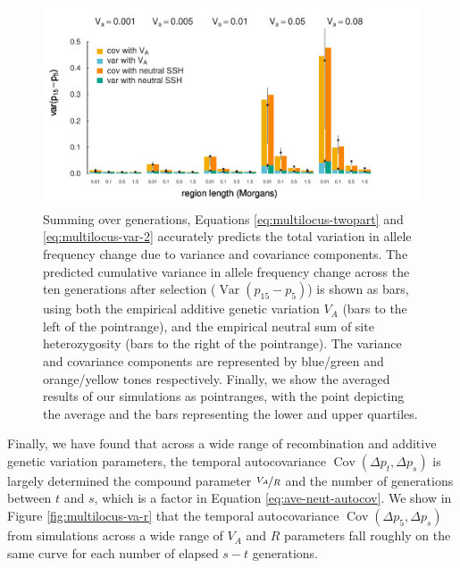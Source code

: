 \documentclass[11pt]{article}
\DeclareMathOperator{\var}{Var}
\DeclareMathOperator{\cov}{Cov}
\begin{document}
\begin{figure}[!ht]
  \centering
  \includegraphics{./images/cummulative-cov-var-all.pdf}

  \caption{Summing over generations, Equations \eqref{eq:multilocus-twopart}
    and \eqref{eq:multilocus-var-2} accurately predicts the total variation in
    allele frequency change due to variance and covariance components. The
    predicted cumulative variance in allele frequency change across the ten
    generations after selection ($\var(p_{15} - p_5)$) is shown as bars, using
    both the empirical additive genetic variation $V_A$ (bars to the left of
    the pointrange), and the empirical neutral sum of site heterozygosity (bars
    to the right of the pointrange). The variance and covariance components are
    represented by blue/green and orange/yellow tones respectively. Finally, we
    show the averaged results of our simulations as pointranges, with the point
  depicting the average and the bars representing the lower and upper
quartiles.} \label{fig:multilocus-expfit-cumcov}

\end{figure}

Finally, we have found that across a wide range of recombination and additive
genetic variation parameters, the temporal autocovariance $\cov(\Delta p_t,
\Delta p_s)$ is largely determined the compound parameter $\nicefrac{V_A}{R}$
and the number of generations between $t$ and $s$, which is a factor in
Equation \eqref{eq:ave-neut-autocov}. We show in Figure
\ref{fig:multilocus-va-r} that the temporal autocovariance $\cov(\Delta p_5,
\Delta p_s)$ from simulations across a wide range of $V_A$ and $R$ parameters
fall roughly on the same curve for each number of elapsed $s-t$ generations.
\end{document}
